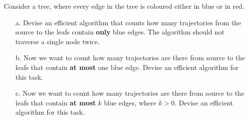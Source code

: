 Consider a tree, where every edge in the tree is coloured either in blue or in red.
\begin{enumerate}
\item[a.] Devise an efficient algorithm that counts how many trajectories from the source to the leafs contain \textbf{only} blue edges. The algorithm should not traverse a single node twice.
\item[b.] Now we want to count how many trajectories are there from source to the leafs that contain \textbf{at most} one blue edge.
Devise an efficient algorithm for this task.
\item[c.] Now we want to count how many trajectories are there from source to the leafs that contain \textbf{at most} $k$ blue edges, where $k>0$.
Devise an efficient algorithm for this task.
\end{enumerate}
